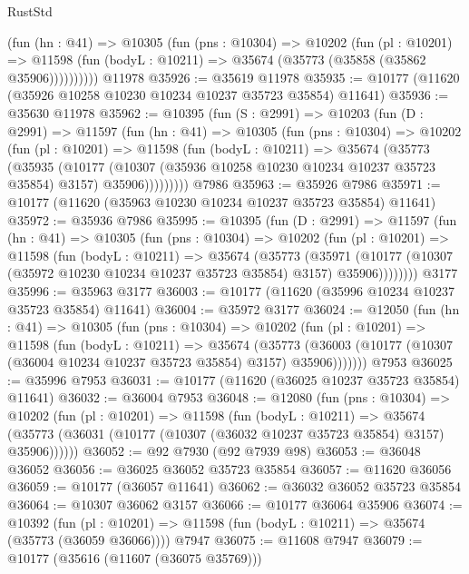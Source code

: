 \begin{lexlean}{RustStd}
\begin{coremodule}
          (fun (hn : @41) =>
          @10305
            (fun (pns : @10304) =>
            @10202
              (fun (pl : @10201) =>
              @11598 (fun (bodyL : @10211) => @35674 (@35773 (@35858 (@35862 @35906))))))))))
    @11978
@35926 := @35619 @11978
@35935 := @10177 (@11620 (@35926 @10258 @10230 @10234 @10237 @35723 @35854) @11641)
@35936 := @35630 @11978
@35962 := @10395
    (fun (S : @2991) =>
    @10203
      (fun (D : @2991) =>
      @11597
        (fun (hn : @41) =>
        @10305
          (fun (pns : @10304) =>
          @10202
            (fun (pl : @10201) =>
            @11598
              (fun (bodyL : @10211) =>
              @35674
                (@35773
                  (@35935
                    (@10177
                      (@10307 (@35936 @10258 @10230 @10234 @10237 @35723 @35854) @3157)
                      @35906)))))))))
    @7986
@35963 := @35926 @7986
@35971 := @10177 (@11620 (@35963 @10230 @10234 @10237 @35723 @35854) @11641)
@35972 := @35936 @7986
@35995 := @10395
    (fun (D : @2991) =>
    @11597
      (fun (hn : @41) =>
      @10305
        (fun (pns : @10304) =>
        @10202
          (fun (pl : @10201) =>
          @11598
            (fun (bodyL : @10211) =>
            @35674
              (@35773
                (@35971
                  (@10177 (@10307 (@35972 @10230 @10234 @10237 @35723 @35854) @3157) @35906))))))))
    @3177
@35996 := @35963 @3177
@36003 := @10177 (@11620 (@35996 @10234 @10237 @35723 @35854) @11641)
@36004 := @35972 @3177
@36024 := @12050
    (fun (hn : @41) =>
    @10305
      (fun (pns : @10304) =>
      @10202
        (fun (pl : @10201) =>
        @11598
          (fun (bodyL : @10211) =>
          @35674
            (@35773
              (@36003 (@10177 (@10307 (@36004 @10234 @10237 @35723 @35854) @3157) @35906)))))))
    @7953
@36025 := @35996 @7953
@36031 := @10177 (@11620 (@36025 @10237 @35723 @35854) @11641)
@36032 := @36004 @7953
@36048 := @12080
    (fun (pns : @10304) =>
    @10202
      (fun (pl : @10201) =>
      @11598
        (fun (bodyL : @10211) =>
        @35674 (@35773 (@36031 (@10177 (@10307 (@36032 @10237 @35723 @35854) @3157) @35906))))))
@36052 := @92 @7930 (@92 @7939 @98)
@36053 := @36048 @36052
@36056 := @36025 @36052 @35723 @35854
@36057 := @11620 @36056
@36059 := @10177 (@36057 @11641)
@36062 := @36032 @36052 @35723 @35854
@36064 := @10307 @36062 @3157
@36066 := @10177 @36064 @35906
@36074 := @10392
    (fun (pl : @10201) => @11598 (fun (bodyL : @10211) => @35674 (@35773 (@36059 @36066))))
    @7947
@36075 := @11608 @7947
@36079 := @10177 (@35616 (@11607 (@36075 @35769)))

\end{coremodule}
\end{lexlean}

